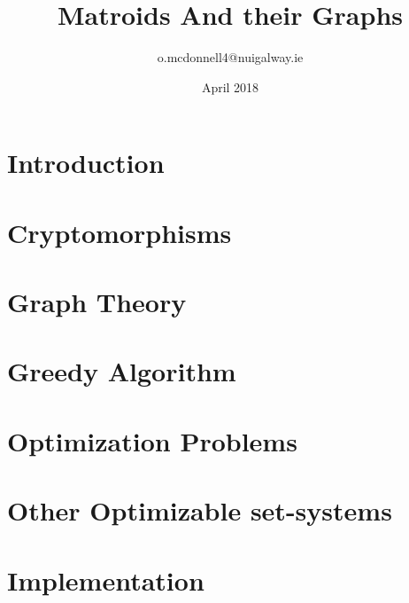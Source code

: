 \documentclass{article}
\title{Matroids And their Graphs}
\author{o.mcdonnell4@nuigalway.ie }
\date{April 2018}
\theoremstyle{plain}
\theoremstyle{definition}
\theoremstyle{remark}
\begin{document}
 
\maketitle
\tableofcontents
\pagebreak


\section{Introduction}

\pagebreak




\pagebreak

\section{Cryptomorphisms}






\pagebreak

\section{Graph Theory}


\pagebreak

\section{Greedy Algorithm}


\pagebreak

\section{Optimization Problems}





\pagebreak

\section{Other Optimizable set-systems}




\section{Implementation}



\end{document}

